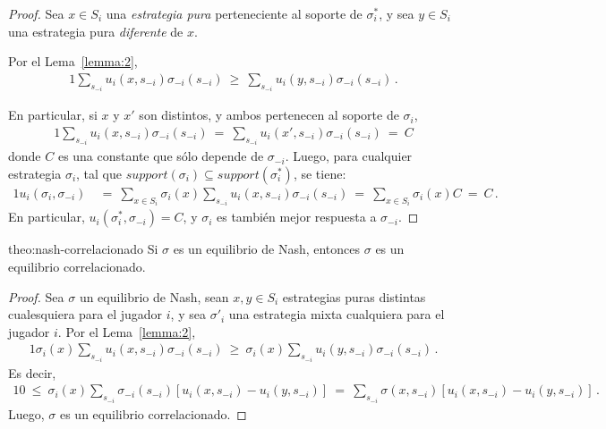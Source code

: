 \begin{proof}
Sea $x \in S_i$ una \emph{estrategia pura} perteneciente al soporte de $\sigma^*_i$, y sea $y \in S_i$ una estrategia pura \emph{diferente} de $x$. 

Por el Lema~\ref{lemma:2},
\begin{alignat}{1}
  \sum_{s_{-i}} u_i(x,s_{-i}) \sigma_{-i}(s_{-i})\ \geq\  \sum_{s_{-i}} u_i(y,s_{-i}) \sigma_{-i}(s_{-i}) \,.
\end{alignat}

En particular, si $x$ y $x'$ son distintos, y ambos pertenecen al soporte de $\sigma_i$,
\begin{alignat}{1}
\sum_{s_{-i}} u_i(x,s_{-i}) \sigma_{-i}(s_{-i})\ =\ \sum_{s_{-i}} u_i(x',s_{-i}) \sigma_{-i}(s_{-i})\ =\ C
\end{alignat}
donde $C$ es una constante que s\'olo depende de $\sigma_{-i}$.
Luego, para cualquier estrategia $\sigma_i$, tal que $support(\sigma_i) \subseteq support(\sigma^*_i)$, se tiene:
\begin{alignat}{1}
u_i(\sigma_i, \sigma_{-i})\ &=\ \sum_{x \in S_i} \sigma_i(x) \sum_{s_{-i}} u_i(x,s_{-i}) \sigma_{-i}(s_{-i})\ =\ \sum_{x \in S_i} \sigma_i(x) C\ =\ C \,.
\end{alignat}
En particular, $u_i(\sigma^*_i,\sigma_{-i})=C$, y $\sigma_i$ es también mejor respuesta a $\sigma_{-i}$.
\end{proof}

\begin{reptheorem}{theo:nash-correlacionado}
Si $\sigma$ es un equilibrio de Nash, entonces $\sigma$ es un equilibrio correlacionado.
\end{reptheorem}

\begin{proof}
Sea $\sigma$ un equilibrio de Nash, sean $x,y\in S_i$ estrategias puras distintas cualesquiera para el jugador $i$, y sea $\sigma'_i$ una estrategia mixta cualquiera para el jugador $i$. Por el Lema~\ref{lemma:2},
\begin{alignat}{1}
  \sigma_i(x) \sum_{s_{-i}} u_i(x,s_{-i}) \sigma_{-i}(s_{-i})\ \geq\  \sigma_i(x)\sum_{s_{-i}} u_i(y,s_{-i}) \sigma_{-i}(s_{-i}) \,.
\end{alignat}
Es decir,
\begin{alignat}{1}
  0\ \leq\ \sigma_i(x) \sum_{s_{-i}} \sigma_{-i}(s_{-i}) [u_i(x,s_{-i}) - u_i(y,s_{-i})]\ =\ \sum_{s_{-i}} \sigma(x,s_{-i}) [u_i(x,s_{-i}) - u_i(y,s_{-i})] \,.
\end{alignat}
Luego, $\sigma$ es un equilibrio correlacionado.
\end{proof}

